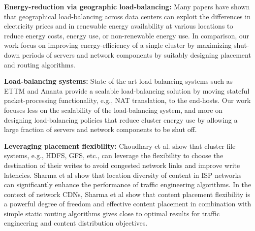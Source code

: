 






\textbf{Energy-reduction via geographic load-balancing:} Many papers \cite{qureshi2009cutting,Liu11,Gao12,Rao10} have shown that geographical load-balancing across data centers can exploit the differences in electricity prices and in renewable energy availability at various locations to reduce energy costs,  energy use, or non-renewable energy use. In comparison, our work focus on improving energy-efficiency of a single cluster by maximizing shut-down periods of servers and network components by  suitably designing placement and routing algorithms.



\textbf{Load-balancing systems:} State-of-the-art load balancing systems such as ETTM \cite{ettm} and  Ananta \cite{ananta} provide a scalable load-balancing solution by moving stateful packet-processing functionality, e.g., NAT translation, to the end-hosts. Our work focuses less on the scalability of the load-balancing system, and more on designing load-balancing policies that reduce cluster energy use by allowing a large fraction of servers and network components to be shut off.

\textbf{Leveraging placement flexibility:} Choudhary et al. \cite{Chowdhury}  show that cluster file systems, e.g., HDFS, GFS, etc., can leverage the flexibility to choose the destination of their writes to avoid congested network links and improve write latencies. Sharma et al \cite{beyondmlu} show that location diversity of content in ISP networks can significantly enhance the performance of traffic engineering algorithms. In the context of  network CDNs, Sharma et al \cite{NCDN} show that content placement flexibility is a powerful degree of freedom and effective content placement in combination with simple static routing algorithms gives close to optimal results for traffic engineering and content distribution objectives. 


